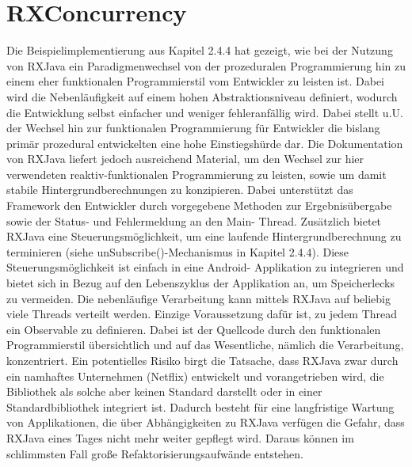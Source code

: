\documentclass[12pt,oneside,a4paper,bibtotoc,liststotoc]{scrreprt}
\begin{document}
\section{RXConcurrency}
Die Beispielimplementierung aus Kapitel 2.4.4 hat gezeigt, wie bei der Nutzung von RXJava ein Paradigmenwechsel von der prozeduralen Programmierung hin zu einem eher funktionalen Programmierstil vom Entwickler zu leisten ist. Dabei wird die Nebenläufigkeit auf einem hohen Abstraktionsniveau definiert, wodurch die Entwicklung selbst einfacher und weniger fehleranfällig wird. Dabei stellt u.U. der Wechsel hin zur funktionalen Programmierung für Entwickler die bislang primär prozedural entwickelten eine hohe Einstiegshürde dar. Die Dokumentation von RXJava liefert jedoch ausreichend Material, um den Wechsel zur hier verwendeten reaktiv-funktionalen Programmierung zu leisten, sowie um damit stabile Hintergrundberechnungen zu konzipieren. Dabei unterstützt das Framework den Entwickler durch vorgegebene Methoden zur Ergebnisübergabe sowie der Status- und Fehlermeldung an den Main- Thread. Zusätzlich bietet RXJava eine Steuerungsmöglichkeit, um eine laufende Hintergrundberechnung zu terminieren (siehe unSubscribe()-Mechanismus in Kapitel 2.4.4). Diese Steuerungsmöglichkeit ist einfach in eine Android- Applikation zu integrieren und bietet sich in Bezug auf den Lebenszyklus der Applikation an, um Speicherlecks zu vermeiden. Die nebenläufige Verarbeitung kann mittels RXJava auf beliebig viele Threads verteilt werden. Einzige Voraussetzung dafür ist, zu jedem Thread ein Observable zu definieren. Dabei ist der Quellcode durch den funktionalen Programmierstil übersichtlich und auf das Wesentliche, nämlich die Verarbeitung, konzentriert.\newline
Ein potentielles Risiko birgt die Tatsache, dass RXJava zwar durch ein namhaftes Unternehmen (Netflix) entwickelt und vorangetrieben wird, die Bibliothek als solche aber keinen Standard darstellt oder in einer Standardbibliothek integriert ist. Dadurch besteht für eine langfristige Wartung von Applikationen, die über Abhängigkeiten zu RXJava verfügen die Gefahr, dass RXJava eines Tages nicht mehr weiter gepflegt wird. Daraus können im schlimmsten Fall große Refaktorisierungsaufwände entstehen.
\end{document}
